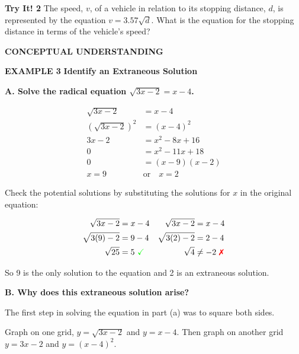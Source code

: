 \documentclass{article}
\newenvironment{example}[1]{\textbf{EXAMPLE #1}\quad}{}
\newenvironment{tryit}[1]{\textbf{Try It! #1}\quad}{}
\newcommand{\answer}[1]{}
\begin{document}
\begin{tryit}{2}
The speed, $v$, of a vehicle in relation to its stopping distance, $d$, is represented by the equation $v = 3.57\sqrt{d}$. What is the equation for the stopping distance in terms of the vehicle's speed?
\answer{$d = \left(\frac{v}{3.57}\right)^2$}
\end{tryit}

\clearpage
\textbf{CONCEPTUAL UNDERSTANDING}

\begin{example}{3}
\textbf{Identify an Extraneous Solution}

\textbf{A. Solve the radical equation $\sqrt{3x - 2} = x - 4$.}

\begin{align*}
\sqrt{3x - 2} &= x - 4 \\
(\sqrt{3x - 2})^2 &= (x - 4)^2 \\
3x - 2 &= x^2 - 8x + 16 \\
0 &= x^2 - 11x + 18 \\
0 &= (x - 9)(x - 2) \\
x = 9 \quad &\text{or} \quad x = 2
\end{align*}

Check the potential solutions by substituting the solutions for $x$ in the original equation:

\begin{align*}
\sqrt{3x - 2} &= x - 4 & \sqrt{3x - 2} &= x - 4 \\
\sqrt{3(9) - 2} &= 9 - 4 & \sqrt{3(2) - 2} &= 2 - 4 \\
\sqrt{25} &= 5 \ \text{\textcolor{green}{\checkmark}} & \sqrt{4} &\neq -2 \ \text{\textcolor{red}{\ding{55}}}
\end{align*}

So 9 is the only solution to the equation and 2 is an extraneous solution.

\textbf{B. Why does this extraneous solution arise?}

The first step in solving the equation in part (a) was to square both sides. 

Graph on one grid, $y = \sqrt{3x - 2}$ and $y = x - 4$. Then graph on another grid $y = 3x - 2$ and $y = (x - 4)^2$.


\end{example}
\end{document}
